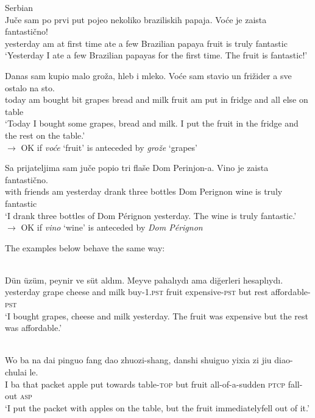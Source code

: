 \documentclass[output=paper,
modfonts
]{langscibook}
\begin{document}
	\ea \label{ex:despic:18} 
	Serbian \\
	\ea \label{ex:despic:18a} 
	\gll
	{Ju\v ce} {sam} {po} {prvi} {put} {pojeo} {nekoliko} {braziliskih} {papaja}. {Vo\'ce} {je} {zaista} {fantasti\v cno!} \\
	yesterday am at first time ate {a few} Brazilian papaya fruit is truly fantastic \\ 
	\glt `Yesterday I ate a few Brazilian papayas for the first time. The fruit is fantastic!'
	
	\ex \label{ex:despic:18b} 
	\gll 
	{Danas} {sam} {kupio} {malo} {gro\v z\dj a}, {hleb} {i} {mleko}. {Vo\'ce} {sam} {stavio} {un} {fri\v zider} {a} {sve} {ostalo} {na} {sto}. \\
	today am bought bit grapes bread and milk fruit am put in fridge and all else on table \\ 
	\glt `Today I bought some grapes, bread and milk. I put the fruit in the fridge and the rest on the table.' \\
	$\rightarrow$ OK if \textit{vo\'ce} `fruit' is anteceded by \textit{gro\v z\dj e} `grapes' 
	
	\ex \label{ex:despic:18c} 
	\gll
	{Sa} {prijateljima} {sam} {ju\v ce} {popio} {tri} {fla\v se} {Dom Perinjon-a}. {Vino} {je} {zaista} {fantasti\v cno.}\\
	with friends am yesterday drank three bottles {Dom Perignon} wine is truly fantastic \\ 
	\glt `I drank three bottles of Dom P\'erignon yesterday. The wine is truly fantastic.' \\
	$\rightarrow$ OK if \textit{vino} `wine' is anteceded by \textit{Dom P\'erignon} 
	\z
	\z
	
	The examples below behave the same way:
	
	\ea \label{ex:despic:19}
	 \\
	\gll
	{D\"un} {\"uz\"um}, {peynir} {ve} {s\"ut} {ald\i m}. {Meyve} {pahal\i yd\i} {ama} {di\u gerleri} {hesapl\i yd\i}. \\
	yesterday grape cheese and milk buy-1.\textsc{pst} fruit expensive-\textsc{pst} but rest affordable-\textsc{pst} \\ 
	\glt `I bought grapes, cheese and milk yesterday. The fruit was expensive but the rest was affordable.'
	\z 
	
	\ea \label{ex:despic:20} 
	 \\ 
	\ea \label{ex:despic:20a} 
	\gll
	{Wo} {ba} {na} {dai} {pinguo} {fang} {dao} {zhuozi-shang}, {danshi} {shuiguo} {yixia zi} {jiu} {diao-chulai} {le.}  \\
	I ba that packet apple put towards table-\textsc{top} but fruit all-of-a-sudden \textsc{ptcp} fall-out \textsc{asp} \\ 
	\glt `I put the packet with apples on the table, but the fruit immediately\largerpage fell out of it.'
	
\end{document}
